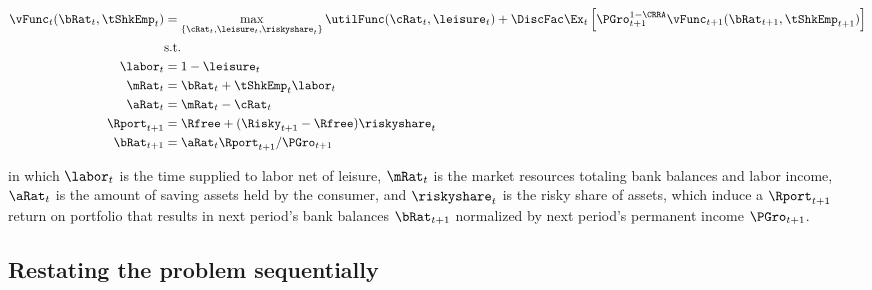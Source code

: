 \documentclass[\econtexRoot/SequentialEGM]{subfiles}
\begin{document}
\begin{equation}
        \begin{split}
                \vFunc_{t}(\bRat_{t}, \tShkEmp_{t}) & = \max_{\{\cRat_{t},
                        \leisure_{t}, \riskyshare_{t}\}} \utilFunc(\cRat_{t}, \leisure_{t}) +
                \DiscFac \Ex_{t} \left[ \PGro_{t+1}^{1-\CRRA}
                        \vFunc_{t+1} (\bRat_{t+1},
                        \tShkEmp_{t+1}) \right] \\
                & \text{s.t.} \\
                \labor_{t} & = 1 - \leisure_{t} \\
                \mRat_{t} & = \bRat_{t} + \tShkEmp_{t}\labor_{t} \\
                \aRat_{t} & = \mRat_{t} - \cRat_{t} \\
                \Rport_{t+1} & = \Rfree + (\Risky_{t+1} - \Rfree)
                \riskyshare_{t} \\
                \bRat_{t+1} & = \aRat_{t} \Rport_{t+1} / \PGro_{t+1}
        \end{split}
\end{equation}

in which $\labor_{t}$ is the time supplied to labor net of leisure, $\mRat_{t}$ is the market resources totaling bank balances and labor income, $\aRat_{t}$ is the amount of saving assets held by the consumer, and $\riskyshare_{t}$ is the risky share of assets, which induce a $\Rport_{t+1}$ return on portfolio that results in next period's bank balances $\bRat_{t+1}$ normalized by next period's permanent income $\PGro_{t+1}$.


\subsection{Restating the problem sequentially}
\end{document}
